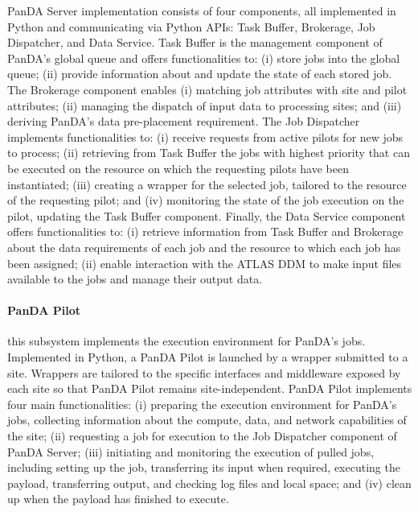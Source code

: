 
PanDA Server implementation consists of four components, all implemented in
Python and communicating via Python APIs: Task Buffer, Brokerage, Job
Dispatcher, and Data Service. Task Buffer is the management component of PanDA's
global queue and offers functionalities to: (i) store jobs into the global
queue; (ii) provide information about and update the state of each stored job.
The Brokerage component enables (i) matching job attributes with site and pilot
attributes; (ii) managing the dispatch of input data to processing sites; and
(iii) deriving PanDA's data pre-placement requirement.
The Job Dispatcher implements functionalities to: (i) receive requests from
active pilots for new jobs to process; (ii) retrieving from Task Buffer the jobs
with highest priority that can be executed on the resource on which the
requesting pilots have been instantiated; (iii) creating a wrapper for the
selected job, tailored to the resource of the requesting pilot; and (iv)
monitoring the state of the job execution on the pilot, updating the Task Buffer
component. Finally, the Data Service component offers functionalities to: (i)
retrieve information from Task Buffer and Brokerage about the data requirements
of each job and the resource to which each job has been assigned; (ii) enable
interaction with the ATLAS DDM to make input files available to the jobs and
manage their output data.

\paragraph{\textbf{PanDA Pilot}} this subsystem implements the execution
environment for PanDA's jobs. Implemented in Python, a PanDA Pilot is launched
by a wrapper submitted to a site. Wrappers are tailored to the
specific interfaces and middleware exposed by each site so that PanDA Pilot
remains site-independent. PanDA Pilot implements four main functionalities: (i)
preparing the execution environment for PanDA's jobs,
collecting information about the compute, data, and network capabilities of the
site; (ii) requesting a job for execution to the Job Dispatcher component of
PanDA Server; (iii) initiating and monitoring the execution of pulled jobs,
including setting up the job, transferring its input when required, executing
the payload, transferring output, and checking log files and local space; and
(iv) clean up when the payload has finished to execute.

